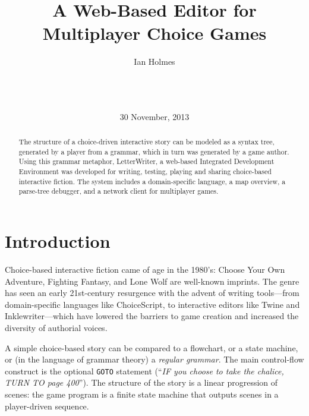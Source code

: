 \documentclass{acm_proc_article-sp}
\begin{document}
\title{A Web-Based Editor for Multiplayer Choice Games}
\author{
\alignauthor
Ian Holmes\\
       \\
       \\
       \\
}
\date{30 November, 2013}

\maketitle
\begin{abstract}
The structure of a choice-driven interactive story can be modeled as a syntax tree, generated by a player
 from a grammar, which in turn was generated by a game author.
Using this grammar metaphor, LetterWriter,
 a web-based Integrated Development Environment was developed
 for writing, testing, playing and sharing choice-based interactive fiction.
The system includes a domain-specific language,
 a map overview, a parse-tree debugger, and a network client for multiplayer games.
\end{abstract}



\section{Introduction}

Choice-based interactive fiction came of age in the 1980's:
Choose Your Own Adventure\cite{packard1982cave}, Fighting Fantasy\cite{jackson1982warlock},
and Lone Wolf are well-known imprints.
The genre has seen an early 21st-century resurgence with the advent of writing
tools---from domain-specific languages like ChoiceScript\cite{ChoiceScript},
to interactive editors like Twine\cite{Twine} and Inklewriter\cite{Inklewriter}---which
have lowered the barriers to game creation and increased the diversity of authorial voices.

A simple choice-based story can be compared to a flowchart, or a state machine,
or (in the language of grammar theory) a {\em regular grammar}.
The main control-flow construct is the optional {\tt GOTO} statement
(``{\em IF you choose to take the chalice, TURN TO page 400}'').
The structure of the story is a linear progression of scenes:
 the game program is a finite state machine that outputs scenes in a player-driven sequence.
\end{document}
